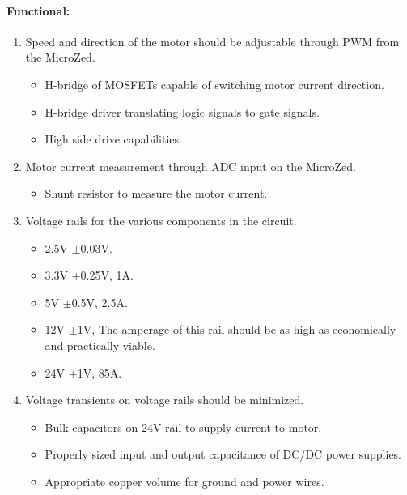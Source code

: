 \paragraph{Functional:}
\begin{enumerate}[resume]
	\item Speed and direction of the motor should be adjustable through PWM from the MicroZed.
	\label{enum:motor_speed_direction}
	\begin{itemize}
		\item H-bridge of MOSFETs capable of switching motor current direction.
		\item H-bridge driver translating logic signals to gate signals.
		\item High side drive capabilities.
	\end{itemize}

	\item Motor current measurement through ADC input on the MicroZed.
	\label{enum:motor_current}
	\begin{itemize}
		\item Shunt resistor to measure the motor current.
	\end{itemize}

	\item Voltage rails for the various components in the circuit.
	\label{enum:voltage_rails}	
	\begin{itemize}
		\item 2.5V $\pm$0.03V.
		\item 3.3V $\pm$0.25V, 1A.
		\item 5V $\pm$0.5V, 2.5A.
		\item 12V $\pm$1V, The amperage of this rail should be as high as economically and practically viable.
		\item 24V $\pm$1V, 85A.
	\end{itemize}

	\item Voltage transients on voltage rails should be minimized.
	\label{enum:voltage_transients}	
	\begin{itemize}
		\item Bulk capacitors on 24V rail to supply current to motor.
		\item Properly sized input and output capacitance of DC/DC power supplies.
		\item Appropriate copper volume for ground and power wires.
	\end{itemize}


\end{enumerate}
